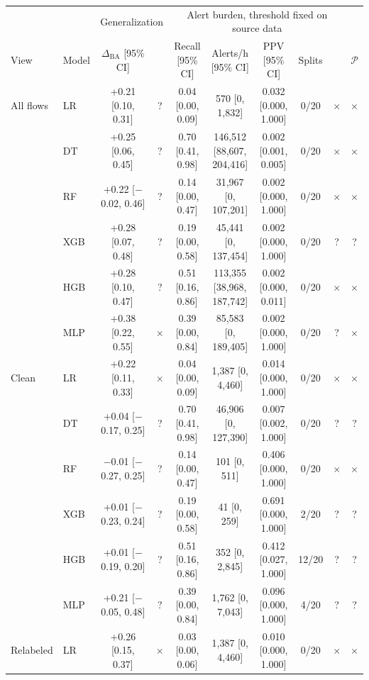 \begin{tabular}{llcccccccc}
\toprule
 & & \multicolumn{2}{c}{Generalization} & \multicolumn{5}{c}{Alert burden, threshold fixed on source data} & \\
\cmidrule(lr){3-4}\cmidrule(lr){5-9}
View & Model & $\Delta_{\mathrm{BA}}$ [95\% CI] & & Recall [95\% CI] & Alerts/h [95\% CI] & PPV [95\% CI] & Splits & & $\mathcal{P}$ \\
\midrule
All flows & LR & +0.21 [0.10, 0.31] & ? & 0.04 [0.00, 0.09] & 570 [0, 1{,}832] & 0.032 [0.000, 1.000] & 0/20 & $\times$ & $\times$ \\
 & DT & +0.25 [0.06, 0.45] & ? & 0.70 [0.41, 0.98] & 146{,}512 [88{,}607, 204{,}416] & 0.002 [0.001, 0.005] & 0/20 & $\times$ & $\times$ \\
 & RF & +0.22 [$-$0.02, 0.46] & ? & 0.14 [0.00, 0.47] & 31{,}967 [0, 107{,}201] & 0.002 [0.000, 1.000] & 0/20 & $\times$ & $\times$ \\
 & XGB & +0.28 [0.07, 0.48] & ? & 0.19 [0.00, 0.58] & 45{,}441 [0, 137{,}454] & 0.002 [0.000, 1.000] & 0/20 & ? & ? \\
 & HGB & +0.28 [0.10, 0.47] & ? & 0.51 [0.16, 0.86] & 113{,}355 [38{,}968, 187{,}742] & 0.002 [0.000, 0.011] & 0/20 & $\times$ & $\times$ \\
 & MLP & +0.38 [0.22, 0.55] & $\times$ & 0.39 [0.00, 0.84] & 85{,}583 [0, 189{,}405] & 0.002 [0.000, 1.000] & 0/20 & ? & $\times$ \\
\midrule
Clean & LR & +0.22 [0.11, 0.33] & $\times$ & 0.04 [0.00, 0.09] & 1{,}387 [0, 4{,}460] & 0.014 [0.000, 1.000] & 0/20 & $\times$ & $\times$ \\
 & DT & +0.04 [$-$0.17, 0.25] & ? & 0.70 [0.41, 0.98] & 46{,}906 [0, 127{,}390] & 0.007 [0.002, 1.000] & 0/20 & ? & ? \\
 & RF & $-$0.01 [$-$0.27, 0.25] & ? & 0.14 [0.00, 0.47] & 101 [0, 511] & 0.406 [0.000, 1.000] & 0/20 & $\times$ & $\times$ \\
 & XGB & +0.01 [$-$0.23, 0.24] & ? & 0.19 [0.00, 0.58] & 41 [0, 259] & 0.691 [0.000, 1.000] & 2/20 & ? & ? \\
 & HGB & +0.01 [$-$0.19, 0.20] & ? & 0.51 [0.16, 0.86] & 352 [0, 2{,}845] & 0.412 [0.027, 1.000] & 12/20 & ? & ? \\
 & MLP & +0.21 [$-$0.05, 0.48] & ? & 0.39 [0.00, 0.84] & 1{,}762 [0, 7{,}043] & 0.096 [0.000, 1.000] & 4/20 & ? & ? \\
\midrule
Relabeled & LR & +0.26 [0.15, 0.37] & $\times$ & 0.03 [0.00, 0.06] & 1{,}387 [0, 4{,}460] & 0.010 [0.000, 1.000] & 0/20 & $\times$ & $\times$ \\

\end{tabular}
